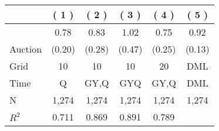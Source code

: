 
\begin{tabular}{lccccc}
\toprule
 & ( 1 ) & ( 2 ) & ( 3 ) & ( 4 ) & ( 5 )\\
\midrule
 & 0.78 & 0.83 & 1.02 & 0.75 & 0.92\\

\multirow{-2}{*}{\raggedright\arraybackslash Auction} & (0.20) & (0.28) & (0.47) & (0.25) & (0.13)\\

\midrule
Grid & 10 & 10 & 10 & 20 & DML\\

Time & Q & GY,Q & GYQ & GY,Q & DML\\

N & 1,274 & 1,274 & 1,274 & 1,274 & 1,274\\

$R^2$ & 0.711 & 0.869 & 0.891 & 0.789 & \\
\bottomrule
\end{tabular}
